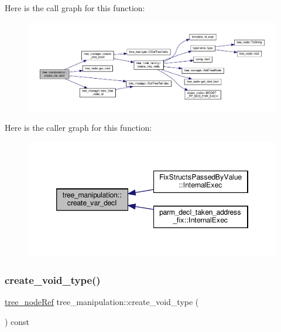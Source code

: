 Here is the call graph for this function\+:
\nopagebreak
\begin{figure}[H]
\begin{center}
\leavevmode
\includegraphics[width=350pt]{d0/d99/classtree__manipulation_ada8044d7be8b0243bd32ae1dd213ce46_cgraph}
\end{center}
\end{figure}
Here is the caller graph for this function\+:
\nopagebreak
\begin{figure}[H]
\begin{center}
\leavevmode
\includegraphics[width=346pt]{d0/d99/classtree__manipulation_ada8044d7be8b0243bd32ae1dd213ce46_icgraph}
\end{center}
\end{figure}
\mbox{\label{classtree__manipulation_a24c0fffd668717617bebb2f4bce4a485}} 
\subsubsection{\texorpdfstring{create\+\_\+void\+\_\+type()}{create\_void\_type()}}
{\footnotesize\ttfamily \hyperlink{tree__node_8hpp_a6ee377554d1c4871ad66a337eaa67fd5}{tree\+\_\+node\+Ref} tree\+\_\+manipulation\+::create\+\_\+void\+\_\+type (\begin{DoxyParamCaption}{ }\end{DoxyParamCaption}) const}



